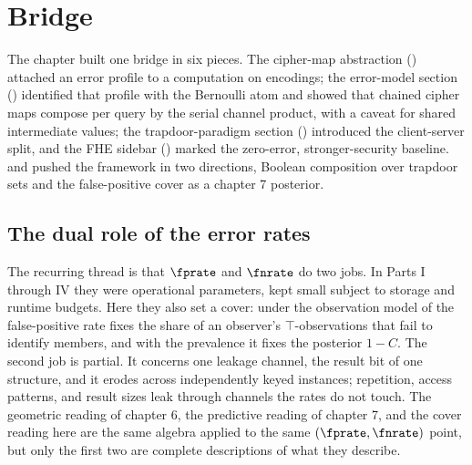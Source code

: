 %

\section{Bridge}
\label{sec:ch17-bridge}

The chapter built one bridge in six pieces. The cipher-map abstraction
() attached an error profile to a computation
on encodings; the error-model section ()
identified that profile with the Bernoulli atom and showed that chained
cipher maps compose per query by the serial channel product, with a
caveat for shared intermediate values; the trapdoor-paradigm section
() introduced the client-server split, and
the FHE sidebar () marked the zero-error,
stronger-security baseline.  and
 pushed the framework in two
directions, Boolean composition over trapdoor sets and the false-positive
cover as a chapter 7 posterior.

\subsection*{The dual role of the error rates}

The recurring thread is that $\fprate$ and $\fnrate$ do two jobs. In
Parts I through IV they were operational parameters, kept small subject to
storage and runtime budgets. Here they also set a cover: under the
observation model of  the
false-positive rate fixes the share of an observer's $\top$-observations
that fail to identify members, and with the prevalence it fixes the
posterior $1 - C$. The second job is partial. It concerns one leakage
channel, the result bit of one structure, and it erodes across
independently keyed instances; repetition, access patterns, and result
sizes leak through channels the rates do not touch. The geometric reading
of chapter 6, the predictive reading of chapter 7, and the cover reading
here are the same algebra applied to the same $(\fprate, \fnrate)$ point,
but only the first two are complete descriptions of what they describe.

